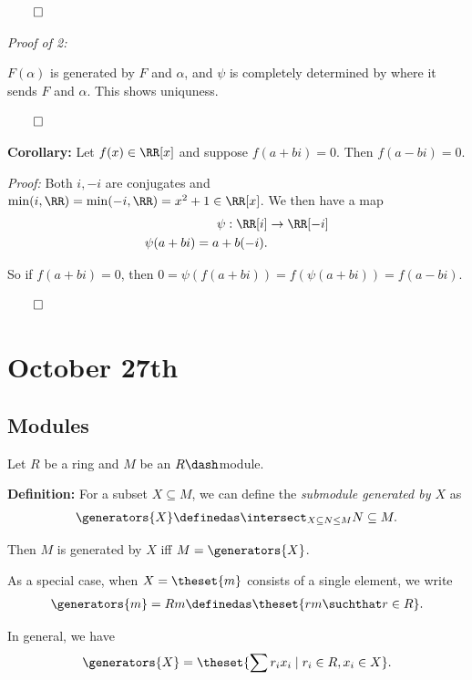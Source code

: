 \(\qed\)

\emph{Proof of 2:}

\(F(\alpha)\) is generated by \(F\) and \(\alpha\), and \(\psi\) is
completely determined by where it sends \(F\) and \(\alpha\). This shows
uniquness.

\(\qed\)

\textbf{Corollary:} Let \(f(x) \in \RR[x]\) and suppose \(f(a+bi)= 0\).
Then \(f(a-bi) = 0\).

\emph{Proof:} Both \(i, -i\) are conjugates and
\(\min(i, \RR) = \min(-i, \RR) = x^2 + 1 \in \RR[x]\). We then have a
map \begin{align*}
\psi: \RR[i] &\to \RR[-i] \\
\psi(a+bi) = a + b(-i)
.\end{align*}

So if \(f(a+bi) = 0\), then
\(0 = \psi(f(a+bi)) = f(\psi(a+bi)) = f(a-bi)\).

\(\qed\)

\hypertarget{october-27th}{%
\section{October 27th}\label{october-27th}}

\hypertarget{modules-1}{%
\subsection{Modules}\label{modules-1}}

Let \(R\) be a ring and \(M\) be an \(R\dash\)module.

\textbf{Definition:} For a subset \(X\subseteq M\), we can define the
\emph{submodule generated by \(X\)} as
\begin{align*}
\generators{X} \definedas \intersect_{X \subseteq N \leq M} N \subseteq M
.\end{align*}

Then \(M\) is generated by \(X\) iff \(M = \generators{X}\).

As a special case, when \(X = \theset{m}\) consists of a single element,
we write
\begin{align*}
\generators{m} = Rm \definedas \theset{rm \suchthat r\in R}
.\end{align*}

In general, we have \begin{align*}
\generators{X} =  \theset{\sum r_i x_i \mid r_i \in R, x_i \in X}
.\end{align*}

